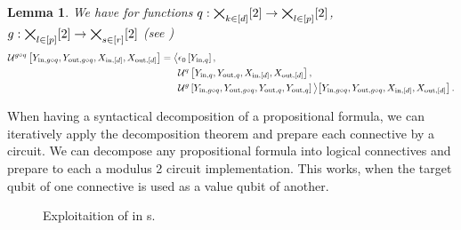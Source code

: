\documentclass[aps,onecolumn,nofootinbib,pra]{article}
\newtheorem{lemma}{Lemma}
\begin{document}
    \begin{lemma}
        We have for functions $q:\bigtimes_{k\in[d]}[2]\rightarrow\bigtimes_{l\in[p]}[2]$, $g:\bigtimes_{l\in[p]}[2]\rightarrow\bigtimes_{s\in[r]}[2]$ (see )
        \begin{align*}
            \mathcal{U}^{g\circ q}\left[Y_{\mathrm{in},g\circ q},Y_{\mathrm{out},g\circ q},X_{\mathrm{in},[d]},X_{\mathrm{out},[d]}\right]
            = \big\langle 
                &\epsilon_{0}\left[Y_{\mathrm{in},q}\right],\\
                &\mathcal{U}^{q}\left[Y_{\mathrm{in},q},Y_{\mathrm{out},q},X_{\mathrm{in},[d]},X_{\mathrm{out},[d]}\right],\\
                &\mathcal{U}^{g}\left[Y_{\mathrm{in},g\circ q},Y_{\mathrm{out},g\circ q},Y_{\mathrm{out},q},Y_{\mathrm{out},q}\right]
             \big\rangle \big[ 
                Y_{\mathrm{in},g\circ q},Y_{\mathrm{out},g\circ q},X_{\mathrm{in},[d]},X_{\mathrm{out},[d]}
             \big] \, .
        \end{align*}
    \end{lemma}

    When having a syntactical decomposition of a propositional formula, we can iteratively apply the \computationCircuit{} decomposition theorem and prepare each connective by a circuit.
    We can decompose any propositional formula into logical connectives and prepare to each a modulus 2 circuit implementation.
    This works, when the target qubit of one connective is used as a value qubit of another.

    \begin{figure}
        \begin{center}
            
        \end{center}
        \caption{
            Exploitaition of \DecompositionSparsity{} in \computationCircuit{}s.
        }\label{fig:qcbencodingDecomposition}
    \end{figure}
\end{document}
